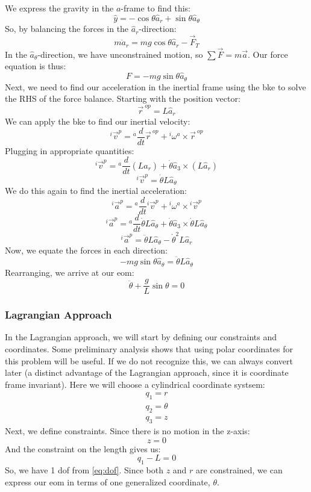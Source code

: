 \documentclass[12pt]{report}
\begin{document}
We express the gravity in the $a$-frame to find this:
$$\hat{y}=-\cos\theta\hat{a}_r+\sin\theta \hat{a}_\theta$$
So, by balancing the forces in the $\hat{a}_r$-direction:
$$m{\ddot{a}}_r=mg\cos\theta \hat{a}_r-\vec{F}_T$$
In the $\hat{a}_\theta$-direction, we have unconstrained motion, so $\sum\vec{F}=m\vec{a}$. Our force equation is thus: 
$$F=-mg\sin\theta\hat{a}_{\theta}$$
Next, we need to find our acceleration in the \gls{inertial frame} using the \gls{bke} to solve the RHS of the force balance. Starting with the position vector:
$$\vec{r}^{\ op}=L\hat{a}_r$$
We can apply the \gls{bke} to find our inertial velocity:
$${}^i\vec{v}^p={}^a\frac{d}{dt}\vec{r}^{\ op}+{}^i\omega^a\times\vec{r}^{\ op}$$
Plugging in appropriate quantities:
$${}^i\vec{v}^p={}^a\frac{d}{dt}(L\hat{a}_r)+\dot{\theta}\hat{a}_3\times(L\hat{a}_r)$$
$${}^i\vec{v}^p=\dot{\theta}L\hat{a}_\theta$$
We do this again to find the inertial acceleration:
$${}^i\vec{a}^p={}^a\frac{d}{dt}{}^i\vec{v}^p+{}^i\omega^a\times{}^i\vec{v}^p$$
$${}^i\vec{a}^p={}^a\frac{d}{dt}{}\dot{\theta}L\hat{a}_\theta+\dot{\theta}\hat{a}_3\times\dot{\theta}L\hat{a}_\theta$$
$${}^i\vec{a}^p=\ddot{\theta}L\hat{a}_\theta-\dot{\theta}^2L\hat{a}_r$$
Now, we equate the forces in each direction:
$$-mg\sin\theta\hat{a}_\theta=\ddot{\theta}L\hat{a}_\theta$$
Rearranging, we arrive at our \gls{eom}:
$$\ddot{\theta}+\frac{g}{L}\sin\theta=0$$
\subsubsection{Lagrangian Approach}
In the \gls{Lagrangian} approach, we will start by defining our constraints and coordinates. Some preliminary analysis shows that using polar coordinates for this problem will be useful. If we do not recognize this, we can always convert later (a distinct advantage of the \gls{Lagrangian} approach, since it is coordinate frame invariant). Here we will choose a cylindrical coordinate systsem:
\begin{gather}
    q_1=r\\q_2=\theta\\q_3=z
\end{gather}
Next, we define constraints. Since there is no motion in the z-axis:
$$z=0$$
And the constraint on the length gives us:
$$q_1-L=0$$
So, we have 1 \gls{dof} from \eqref{eq:dof}. Since both $z$ and $r$ are constrained, we can express our \gls{eom} in terms of one generalized coordinate, $\theta$.
\end{document}
